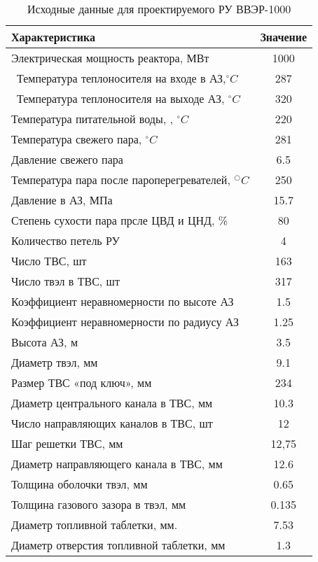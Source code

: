 \begin{table}[H]
	\caption{Исходные данные для проектируемого РУ ВВЭР-1000}
	\begin{center}
        \begin{tabular}{|l|c|}
        \toprule
         Характеристика & Значение \\ 
         \midrule
         \hline
         Электрическая мощность реактора, МВт & 1000 \\
         \hline\ 
         Температура теплоносителя на входе в АЗ,$^\circ C$  & 287 \\ 
         \hline\
         Температура теплоносителя на выходе АЗ, $^\circ C$ & 320 \\ 
         \hline
         Температура питательной воды, , $^\circ C$ & 220 \\ 
         \hline
         Температура свежего пара, $^\circ C$  &  281 \\ 
         \hline
         Давление свежего пара & 6.5 \\ 
         \hline
         Температура пара после пароперегревателей, $^○C$ & 250 \\ 
         \hline
         Давление в АЗ, МПа & 15.7 \\ 
         \hline
         Степень сухости пара прсле ЦВД и ЦНД, \% & 80 \\ 
         \hline
         Количество петель РУ & 4 \\ 
         \hline
         Число ТВС, шт & 163 \\ 
         \hline
         Число твэл в ТВС, шт & 317 \\ 
         \hline
         Коэффициент неравномерности по высоте АЗ & 1.5 \\ 
         \hline
         Коэффициент неравномерности по радиусу АЗ & 1.25 \\ 
         \hline
         Высота АЗ, м & 3.5 \\ 
         \hline
         Диаметр твэл, мм & 9.1 \\ 
         \hline
         Размер ТВС «под ключ», мм & 234 \\ 
         \hline
         Диаметр центрального канала в ТВС, мм & 10.3 \\ 
         \hline
         Число направляющих каналов в ТВС, шт & 12 \\ 
         \hline
         Шаг решетки ТВС, мм & 12,75 \\ 
         \hline
         Диаметр направляющего канала в ТВС, мм & 12.6 \\ 
         \hline
         Толщина оболочки твэл, мм & 0.65 \\ 
         \hline
         Толщина газового зазора в твэл, мм & 0.135 \\ 
         \hline
         Диаметр топливной таблетки, мм. & 7.53 \\ 
         \hline
         Диаметр отверстия топливной таблетки, мм & 1.3 \\ 
         \bottomrule
		\end{tabular}
		\label{tabular:data}
	\end{center}
\end{table}




